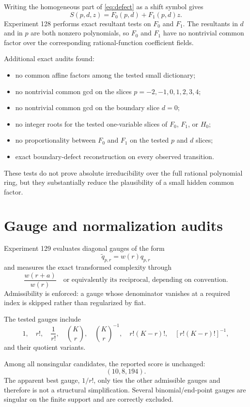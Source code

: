 \documentclass[11pt,a4paper]{article}
\begin{document}
Writing the homogeneous part of \eqref{eq:defect} as a shift symbol gives
\begin{equation}
\label{eq:symbol}
S(p,d,z)=F_0(p,d)+F_1(p,d)z.
\end{equation}
Experiment 128 performs exact resultant tests on $F_0$ and $F_1$.  The resultants in $d$ and in $p$ are both nonzero polynomials, so $F_0$ and $F_1$ have no nontrivial common factor over the corresponding rational-function coefficient fields.

Additional exact audits found:
\begin{itemize}
  \item no common affine factors among the tested small dictionary;
  \item no nontrivial common gcd on the slices $p=-2,-1,0,1,2,3,4$;
  \item no nontrivial common gcd on the boundary slice $d=0$;
  \item no integer roots for the tested one-variable slices of $F_0$, $F_1$, or $H_0$;
  \item no proportionality between $F_0$ and $F_1$ on the tested $p$ and $d$ slices;
  \item exact boundary-defect reconstruction on every observed transition.
\end{itemize}

These tests do not prove absolute irreducibility over the full rational polynomial ring, but they substantially reduce the plausibility of a small hidden common factor.

\section{Gauge and normalization audits}

Experiment 129 evaluates diagonal gauges of the form
\[
\widetilde q_{p,r}=w(r)q_{p,r}
\]
and measures the exact transformed complexity through
\[
\frac{w(r+a)}{w(r)}
\quad\text{or equivalently its reciprocal, depending on convention}.
\]
Admissibility is enforced: a gauge whose denominator vanishes at a required index is skipped rather than regularized by fiat.

The tested gauges include
\[
1,\quad r!,\quad \frac1{r!},\quad
\binom{K}{r},\quad \binom{K}{r}^{-1},\quad
r!(K-r)!,\quad [r!(K-r)!]^{-1},
\]
and their quotient variants.

Among all nonsingular candidates, the reported score is unchanged:
\[
(10,8,194).
\]
The apparent best gauge, $1/r!$, only ties the other admissible gauges and therefore is not a structural simplification.  Several binomial/end-point gauges are singular on the finite support and are correctly excluded.
\end{document}
